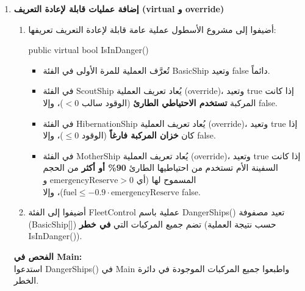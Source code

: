\documentclass[14pt]{extarticle}
\begin{document}
\begin{enumerate}[label=\textbf{تمرين \arabic*:}, wide=0pt, leftmargin=*, itemsep=2.2em]
    \item \textbf{إضافة عمليات قابلة لإعادة التعريف (\textenglish{virtual} و \textenglish{override})}
    \begin{enumerate}[label=\textbf{(\arabic*)}]
        \item أضيفوا إلى مشروع الأسطول عملية عامة قابلة لإعادة التعريف تعريفها:
        \begin{center}
        \textenglish{public virtual bool IsInDanger()}
        \end{center}
        \begin{itemize}
            \item تُعرَّف العملية للمرة الأولى في الفئة \textenglish{BasicShip} وتعيد \textenglish{false} دائماً.
            \item في الفئة \textenglish{ScoutShip} يُعاد تعريف العملية (\textenglish{override})، وتعيد \textenglish{true} إذا كانت المركبة \textbf{تستخدم الاحتياطي الطارئ} (الوقود سالب $< 0$)، وإلا \textenglish{false}.
            \item في الفئة \textenglish{HibernationShip} يُعاد تعريف العملية (\textenglish{override})، وتعيد \textenglish{true} إذا كان \textbf{خزان المركبة فارغاً} (الوقود $\le 0$)، وإلا \textenglish{false}.
            \item في الفئة \textenglish{MotherShip} يُعاد تعريف العملية (\textenglish{override})، وتعيد \textenglish{true} إذا كانت السفينة الأم تستخدم من احتياطيها الطارئ \textbf{90\% أو أكثر} من الحجم المسموح لها (أي $\text{emergencyReserve} > 0$ و $\text{fuel} \le -0.9 \cdot \text{emergencyReserve}$)، وإلا \textenglish{false}.
        \end{itemize}
        \item أضيفوا إلى الفئة \textenglish{FleetControl} عملية باسم \textenglish{DangerShips()} تعيد مصفوفة (\textenglish{BasicShip[]}) تضم جميع المركبات التي \textbf{في خطر} (حسب نتيجة العملية \textenglish{IsInDanger()}).
    \end{enumerate}
    \textbf{الفحص في \textenglish{Main}:} \\
    استدعوا \textenglish{DangerShips()} في \textenglish{Main} واطبعوا جميع المركبات الموجودة في دائرة الخطر.


\end{enumerate}
\end{document}
